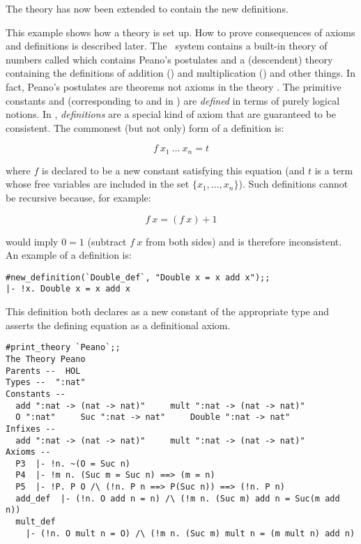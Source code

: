 {\noindent The theory  has now been extended to contain the new
definitions.

This example shows how a theory is set up. How to prove consequences of axioms and
definitions is described later. The \HOL\ system contains a built-in
theory of numbers called  which contains Peano's postulates and a 
(descendent)  theory  containing the definitions of addition
(\ml{+}) and multiplication (\ml{*}) and other things.
In fact, Peano's 
postulates are theorems not axioms in the theory . The primitive constants
 and  (corresponding to  and  in ) are
{\it defined\/} in terms of purely logical notions.
In \HOL, {\it definitions\/} are a special kind of axiom that are
guaranteed to be consistent. The commonest (but not only) form of a definition is: 

\[f\ x_1\ \ldots\ x_n = t\]

\noindent where $f$ is declared to be a new constant satisfying this
equation (and $t$ is a term whose free variables are included in the set
$\{x_1,\ldots,x_n\}$).  Such definitions cannot be recursive because, for
example: 

\[ f\ x = (f\ x)+1 \]

\noindent would imply $0=1$ (subtract $f\ x$ from both sides)
and is therefore inconsistent. An example of a definition is:

\begin{session}\begin{verbatim}
#new_definition(`Double_def`, "Double x = x add x");;
|- !x. Double x = x add x
\end{verbatim}\end{session}

\noindent This definition both declares  as a new constant of the
appropriate type and asserts the defining equation as a definitional axiom.

\begin{session}\begin{verbatim}
#print_theory `Peano`;;
The Theory Peano
Parents --  HOL     
Types --  ":nat"     
Constants --
  add ":nat -> (nat -> nat)"     mult ":nat -> (nat -> nat)"
  O ":nat"     Suc ":nat -> nat"     Double ":nat -> nat"     
Infixes --
  add ":nat -> (nat -> nat)"     mult ":nat -> (nat -> nat)"     
Axioms --
  P3  |- !n. ~(O = Suc n)
  P4  |- !m n. (Suc m = Suc n) ==> (m = n)
  P5  |- !P. P O /\ (!n. P n ==> P(Suc n)) ==> (!n. P n)
  add_def  |- (!n. O add n = n) /\ (!m n. (Suc m) add n = Suc(m add n))
  mult_def
    |- (!n. O mult n = O) /\ (!m n. (Suc m) mult n = (m mult n) add n)
  

\end{verbatim}
\end{session}}
